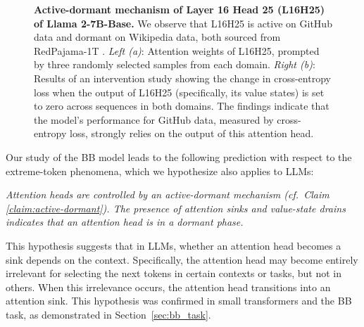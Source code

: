 \begin{figure}
    \vspace{-0.5em}
    \caption{\small \textbf{Active-dormant mechanism of Layer 16 Head 25 (L16H25) of Llama 2-7B-Base.} We observe that L16H25 is active on GitHub data and dormant on Wikipedia data, both sourced from RedPajama-1T \citep{together2023redpajama}. \textit{Left (a)}: Attention weights of L16H25, prompted by three randomly selected samples from each domain. \textit{Right (b)}: Results of an intervention study showing the change in cross-entropy loss when the output of L16H25 (specifically, its value states) is set to zero across sequences in both domains. The findings indicate that the model's performance for GitHub data, measured by cross-entropy loss, strongly relies on the output of this attention head. 
    }
    \label{fig:dormant_heads_domain_dependent}
\end{figure}





Our study of the BB model leads to the following prediction with respect to the extreme-token phenomena, which we hypothesize also applies to LLMs:  
\begin{center}
    \textit{Attention heads are controlled by an active-dormant mechanism (cf.\ Claim \ref{claim:active-dormant}). The presence of attention sinks and value-state drains indicates that an attention head is in a dormant phase.}
\end{center}

This hypothesis suggests that in LLMs, whether an attention head becomes a sink depends on the context. Specifically, the attention head may become entirely irrelevant for selecting the next tokens in certain contexts or tasks, but not in others. When this irrelevance occurs, the attention head transitions into an attention sink. This hypothesis was confirmed in small transformers and the BB task, as demonstrated in Section~\ref{sec:bb_task}. 




